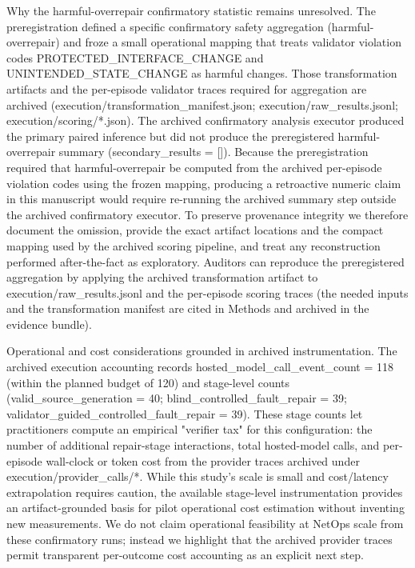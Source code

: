 \documentclass[conference]{IEEEtran}
\begin{document}
Why the harmful-overrepair confirmatory statistic remains unresolved. The preregistration defined a specific confirmatory safety aggregation (harmful-overrepair) and froze a small operational mapping that treats validator violation codes PROTECTED\_INTERFACE\_CHANGE and UNINTENDED\_STATE\_CHANGE as harmful changes. Those transformation artifacts and the per-episode validator traces required for aggregation are archived (execution/transformation\_manifest.json; execution/raw\_results.jsonl; execution/scoring/*.json). The archived confirmatory analysis executor produced the primary paired inference but did not produce the preregistered harmful-overrepair summary (secondary\_results = []). Because the preregistration required that harmful-overrepair be computed from the archived per-episode violation codes using the frozen mapping, producing a retroactive numeric claim in this manuscript would require re-running the archived summary step outside the archived confirmatory executor. To preserve provenance integrity we therefore document the omission, provide the exact artifact locations and the compact mapping used by the archived scoring pipeline, and treat any reconstruction performed after-the-fact as exploratory. Auditors can reproduce the preregistered aggregation by applying the archived transformation artifact to execution/raw\_results.jsonl and the per-episode scoring traces (the needed inputs and the transformation manifest are cited in Methods and archived in the evidence bundle).

Operational and cost considerations grounded in archived instrumentation. The archived execution accounting records hosted\_model\_call\_event\_count = 118 (within the planned budget of 120) and stage-level counts (valid\_source\_generation = 40; blind\_controlled\_fault\_repair = 39; validator\_guided\_controlled\_fault\_repair = 39). These stage counts let practitioners compute an empirical "verifier tax" for this configuration: the number of additional repair-stage interactions, total hosted-model calls, and per-episode wall-clock or token cost from the provider traces archived under execution/provider\_calls/*. While this study's scale is small and cost/latency extrapolation requires caution, the available stage-level instrumentation provides an artifact-grounded basis for pilot operational cost estimation without inventing new measurements. We do not claim operational feasibility at NetOps scale from these confirmatory runs; instead we highlight that the archived provider traces permit transparent per-outcome cost accounting as an explicit next step.
\end{document}
